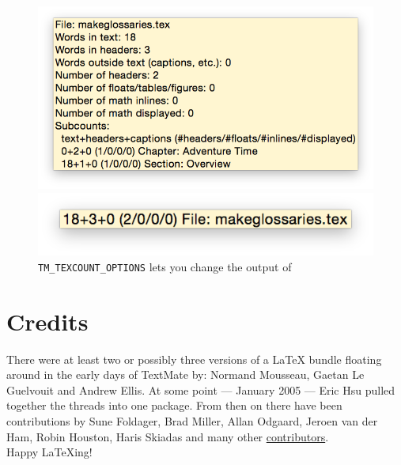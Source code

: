 \documentclass[11pt, x11names]{article}
\begin{document}
\begin{description}
  \begin{figure}[htbp]
    \begin{minipage}[t]{0.5\textwidth}
      \vspace{0cm}
      \centering
        \includegraphics[width=\textwidth]{Figures/TeXcount - Default Options.png}
    \end{minipage}
    \begin{minipage}[t]{0.5\textwidth}
      \vspace{0cm}
      \centering
        \includegraphics[width=\textwidth]{Figures/TeXcount - Custom Options}
    \end{minipage}

    \caption{\texttt{TM\_TEXCOUNT\_OPTIONS} lets you change the output of }
    \label{fig:TeXcount}
  \end{figure}

\end{description}

\section{Credits}

There were at least two or possibly three versions of a LaTeX bundle floating around in the early days of TextMate by: Normand Mousseau, Gaetan Le Guelvouit and Andrew Ellis. At some point — January 2005 — Eric Hsu pulled together the threads into one package. From then on there have been contributions by Sune Foldager, Brad Miller, Allan Odgaard, Jeroen van der Ham, Robin Houston, Haris Skiadas and many other \href{https://github.com/textmate/latex.tmbundle/graphs/contributors}{contributors}.\\

Happy LaTeXing!
\end{document}
